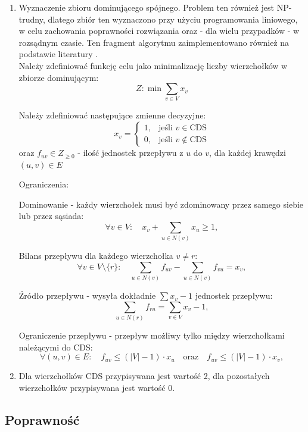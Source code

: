 \begin{enumerate}
    \item Wyznaczenie zbioru dominującego spójnego. Problem ten również jest NP-trudny, dlatego zbiór ten wyznaczono przy użyciu programowania liniowego, w celu zachowania poprawności rozwiązania oraz - dla wielu przypadków - w rozsądnym czasie. Ten fragment algorytmu zaimplementowano również na podstawie literatury \cite{CDS}.\\ 

        Należy zdefiniować funkcję celu jako minimalizację liczby wierzchołków w zbiorze dominującym:
        \[
        Z: \min \sum_{v \in V} x_v
        \]

        Należy zdefiniować następujące zmienne decyzyjne:
        \[
        x_v =
        \begin{cases}
        1, & \text{jeśli } v \in \text{CDS} \\
        0, & \text{jeśli } v \notin \text{CDS}
        \end{cases}
        \]
        oraz \( f_{uv} \in {Z}_{\geq 0} \) - ilość jednostek przepływu z \( u \) do \( v \), dla każdej krawędzi \( (u, v) \in E \)

        Ograniczenia:

        Dominowanie - każdy wierzchołek musi być zdominowany przez samego siebie lub przez sąsiada:
        \[
        \forall v \in V:\quad x_v + \sum_{u \in N(v)} x_u \geq 1, \tag{1}
        \]

        Bilans przepływu dla każdego wierzchołka \( v \neq r \):
        \[
        \forall v \in V \setminus \{r\}:\quad \sum_{u \in N(v)} f_{uv} - \sum_{u \in N(v)} f_{vu} = x_v, \tag{2}
        \]

        Źródło przepływu - wysyła dokładnie \( \sum x_v - 1 \) jednostek przepływu:
        \[
        \sum_{u \in N(r)} f_{ru} = \sum_{v \in V} x_v - 1, \tag{3}
        \]

        Ograniczenie przepływu - przepływ możliwy tylko między wierzchołkami należącymi do CDS:
        \[
        \forall (u, v) \in E:\quad f_{uv} \leq (|V| - 1) \cdot x_u \quad \text{oraz} \quad f_{uv} \leq (|V| - 1) \cdot x_v, \tag{4}
        \]
    \item Dla wierzchołków CDS przypisywana jest wartość 2, dla pozostałych wierzchołków przypisywana jest wartość 0.
\end{enumerate}

\subsection{Poprawność}

